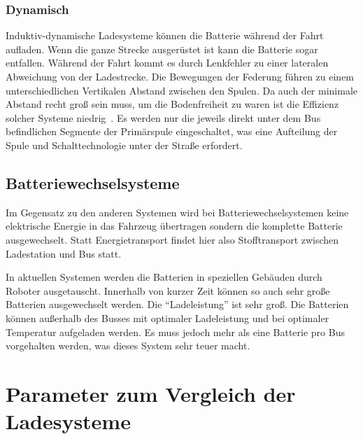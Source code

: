 \subsubsection{Dynamisch}
Induktiv-dynamische Ladesysteme können die Batterie während der Fahrt aufladen. Wenn die ganze Strecke ausgerüstet ist kann die Batterie sogar entfallen. Während der Fahrt kommt es durch Lenkfehler zu einer lateralen Abweichung von der Ladestrecke. Die Bewegungen der Federung führen zu einem unterschiedlichen Vertikalen Abstand zwischen den Spulen. Da auch der minimale Abstand recht groß sein muss, um die Bodenfreiheit zu waren ist die Effizienz solcher Systeme niedrig~\cite{5618092}. Es werden nur die jeweils direkt unter dem Bus befindlichen Segmente der Primärspule eingeschaltet, was eine Aufteilung der Spule und Schalttechnologie unter der Straße erfordert.

\subsection{Batteriewechselsysteme}
Im Gegensatz zu den anderen Systemen wird bei Batteriewechselsystemen keine elektrische Energie in das Fahrzeug übertragen sondern die komplette Batterie ausgewechselt. Statt Energietransport findet hier also Stofftransport zwischen Ladestation und Bus statt. 

In aktuellen Systemen werden die Batterien in speziellen Gebäuden durch Roboter ausgetauscht. Innerhalb von kurzer Zeit können so auch sehr große Batterien ausgewechselt werden. Die "`Ladeleistung"' ist sehr groß. Die Batterien können außerhalb des Busses mit optimaler Ladeleistung und bei optimaler Temperatur aufgeladen werden. Es muss jedoch mehr als eine Batterie pro Bus vorgehalten werden, was dieses System sehr teuer macht.


\section{Parameter zum Vergleich der Ladesysteme}
\label{parameter}

